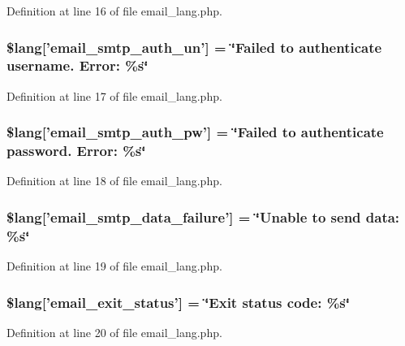 Definition at line 16 of file email\-\_\-lang.\-php.

\subsubsection[{\$lang}]{\setlength{\rightskip}{0pt plus 5cm}\$lang['email\-\_\-smtp\-\_\-auth\-\_\-un'] = \char`\"{}Failed {\bf to} authenticate username. Error\-: \%{\bf s}\char`\"{}}\label{email__lang_8php_a69f2fa5072f039936748571ea5cc9cba}


Definition at line 17 of file email\-\_\-lang.\-php.

\subsubsection[{\$lang}]{\setlength{\rightskip}{0pt plus 5cm}\$lang['email\-\_\-smtp\-\_\-auth\-\_\-pw'] = \char`\"{}Failed {\bf to} authenticate password. Error\-: \%{\bf s}\char`\"{}}\label{email__lang_8php_a09fd123f0d251a8eac845f985c6583c3}


Definition at line 18 of file email\-\_\-lang.\-php.

\subsubsection[{\$lang}]{\setlength{\rightskip}{0pt plus 5cm}\$lang['email\-\_\-smtp\-\_\-data\-\_\-failure'] = \char`\"{}Unable {\bf to} send data\-: \%{\bf s}\char`\"{}}\label{email__lang_8php_a59801e23c2d745400384098c7bf0a6dc}


Definition at line 19 of file email\-\_\-lang.\-php.

\subsubsection[{\$lang}]{\setlength{\rightskip}{0pt plus 5cm}\$lang['email\-\_\-exit\-\_\-status'] = \char`\"{}Exit status code\-: \%{\bf s}\char`\"{}}\label{email__lang_8php_a32b0c2f50acd03defc88df937ee2877f}


Definition at line 20 of file email\-\_\-lang.\-php.

